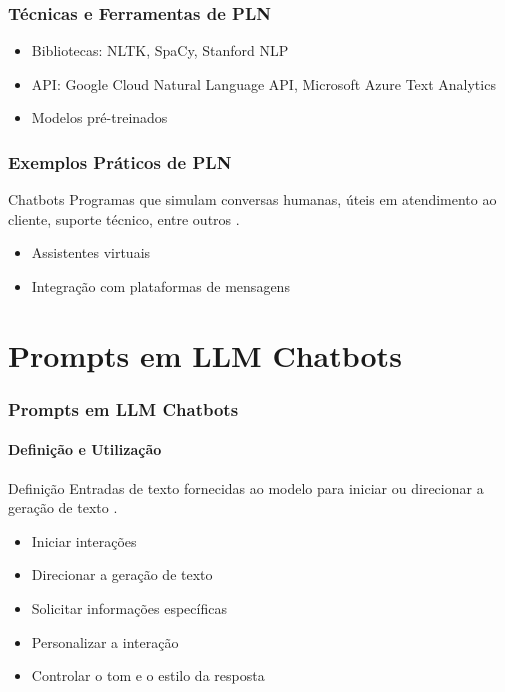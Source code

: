 \documentclass{beamer}
\begin{document}
\begin{frame}
    \frametitle{Técnicas e Ferramentas de PLN}
    \begin{itemize}
        \item Bibliotecas: NLTK, SpaCy, Stanford NLP
        \item API: Google Cloud Natural Language API, Microsoft Azure Text Analytics
        \item Modelos pré-treinados
    \end{itemize}
\end{frame}

\begin{frame}
    \frametitle{Exemplos Práticos de PLN}
    \begin{block}{Chatbots}
        Programas que simulam conversas humanas, úteis em atendimento ao cliente, suporte técnico, entre outros \cite{adamopoulou2020overview, PKenny2011}.
    \end{block}
    \begin{itemize}
        \item Assistentes virtuais
        \item Integração com plataformas de mensagens
    \end{itemize}
\end{frame}

\section{Prompts em LLM Chatbots}
\begin{frame}
    \frametitle{Prompts em LLM Chatbots}
    \framesubtitle{Definição e Utilização}
    \begin{block}{Definição}
        Entradas de texto fornecidas ao modelo para iniciar ou direcionar a geração de texto \cite{NEURIPS2020_1457c0d6}.
    \end{block}
    \begin{itemize}
        \item Iniciar interações
        \item Direcionar a geração de texto
        \item Solicitar informações específicas
        \item Personalizar a interação
        \item Controlar o tom e o estilo da resposta
    \end{itemize}
\end{frame}
\end{document}
